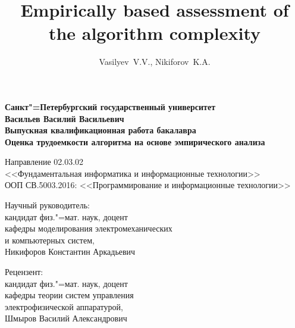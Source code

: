 \documentclass[a4paper, article, 14pt]{extarticle}
\begin{document}

\author{Vasilyev~V.\:V., Nikiforov~K.\:A.}
\title{Empirically based assessment of the algorithm complexity}




\begin{center}
	\textbf{Санкт"=Петербургский государственный университет}\\
	\hfill \break
	\hfill \break
	\textbf{Васильев Василий Васильевич}\\
	\hfill \break
	\hfill \break
	\textbf{Выпускная квалификационная работа бакалавра}\\
	\hfill \break
	\Large{\textbf{Оценка трудоемкости алгоритма на основе эмпирического анализа}}\\
\end{center}

\begin{center}
	Направление 02.03.02\\
	<<Фундаментальная информатика и информационные технологии>>\\
	ООП СВ.5003.2016: <<Программирование и информационные технологии>>\\
\end{center}

\hfill \break

\begin{flushright}
	Научный руководитель:\\
	кандидат физ."=мат. наук, доцент\\
	кафедры моделирования электромеханических\\
	и компьютерных систем,\\
	Никифоров Константин Аркадьевич
\end{flushright}

\begin{flushright}
	Рецензент:\\
	кандидат физ."=мат. наук, доцент\\
	кафедры теории систем управления\\
	электрофизической аппаратурой,\\
	Шмыров Василий Александрович
\end{flushright}

\hfill \break
\end{document}
